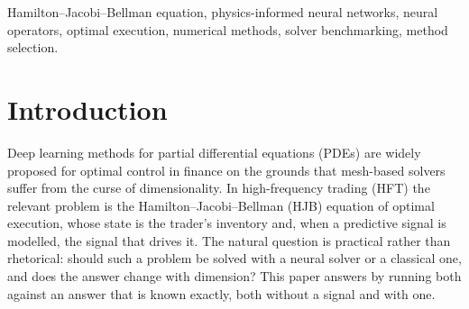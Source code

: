 \documentclass[conference]{IEEEtran}
\begin{document}
\begin{abstract}
Against that reference the comparison gives a boundary rather than a winner. Where a grid scheme can
run ($d \le 5$) it is both faster and more accurate, by a factor of $5.6$ to $114$ in time at
$d=4$ depending on whether the scheme is compiled. Beyond that the classical side does not disappear:
regression Monte Carlo, which needs no grid either, also runs, and on this benchmark it is more
accurate than the neural solver at every
dimension tested --- $R^2$ of $0.999$ at $d=12$ and $0.977$ at $d=20$, against the neural solver's
$0.927$ and $0.757$, in seconds on a CPU rather than minutes on a GPU. Multilevel Picard, the classical
method with a complexity theory behind it, reaches $0.26\%$ relative error at $d=20$ in
$2.3$ seconds where no grid can run. That last result holds at a wider spread: at the benchmark's own
calibration the Picard iteration multilevel Picard realises is not a contraction and it diverges, with
the boundary measured. A single term --- the maximised Hamiltonian, whose coefficient is $1/\eta$ ---
sets the grid's time-step limit, destabilises the explicit deep-splitting recursion, and breaks that
contraction. So the mesh-free region is not
the neural solver's alone, and the accuracy it offers there decays without any internal signal that it
is decaying. On the paper's own market calibration the reconstruction result is worth $2.7$ to $8.4$
basis points of notional across nine instruments. The neural
solver's failure at high dimension is a property of \emph{parameterisation}, not of dimension: the
same architecture fails on a symmetric problem and succeeds on a non-separable one at matched state
dimension.
\end{abstract}

\begin{IEEEkeywords}
Hamilton--Jacobi--Bellman equation, physics-informed neural networks, neural operators, optimal
execution, numerical methods, solver benchmarking, method selection.
\end{IEEEkeywords}

\section{Introduction}

Deep learning methods for partial differential equations (PDEs) are widely proposed for optimal
control in finance on the grounds that mesh-based solvers suffer from the curse of dimensionality.
In high-frequency trading (HFT) the relevant problem is the Hamilton--Jacobi--Bellman (HJB)
equation of optimal execution, whose state is the trader's inventory and, when a predictive signal
is modelled, the signal that drives it. The natural question is practical rather than rhetorical:
should such a problem be solved with a neural solver or a classical one, and does the answer change
with dimension? This paper answers by running both against an answer that is known exactly, both
without a signal and with one.
\end{document}
